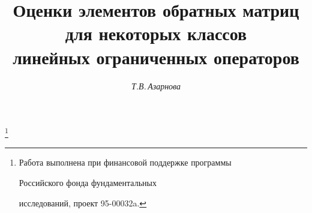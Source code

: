 








 


\newcommand{\A}{{\cal A}} 


\newcommand{\End}{\operatorname{End}} 


\newcommand{\vraisup}{\operatorname{vrai~sup}} 


\newcommand{\tts}[1]{}


 




 


\setcounter{page}{74} 












\author{\it Т.В.\,Азарнова} 




\title{Оценки элементов обратных матриц\\


для некоторых классов\\


линейных ограниченных операторов}


 


\thanks{Работа выполнена при финансовой поддержке программы


Российского фонда фундаментальных


исследований, проект 95-00032a.}


\date{} 


